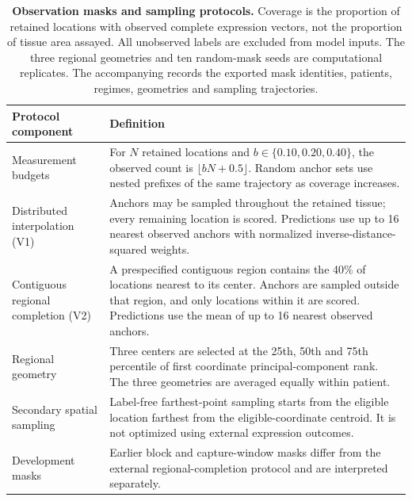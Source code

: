 \begin{table}[htbp]
\caption{\textbf{Observation masks and sampling protocols.} Coverage is the proportion of retained locations with observed complete expression vectors, not the proportion of tissue area assayed. All unobserved labels are excluded from model inputs. The three regional geometries and ten random-mask seeds are computational replicates. The accompanying \protect{} records the exported mask identities, patients, regimes, geometries and sampling trajectories.}
\label{tab:s6}
\centering\small
\begin{tabularx}{\textwidth}{>{\RaggedRight\arraybackslash}p{}Y}\toprule
Protocol component & Definition\\\midrule
Measurement budgets & For $N$ retained locations and $b\in\{0.10,0.20,0.40\}$, the observed count is $\lfloor bN+0.5\rfloor$. Random anchor sets use nested prefixes of the same trajectory as coverage increases.\\
Distributed interpolation (V1) & Anchors may be sampled throughout the retained tissue; every remaining location is scored. Predictions use up to 16 nearest observed anchors with normalized inverse-distance-squared weights.\\
Contiguous regional completion (V2) & A prespecified contiguous region contains the 40\% of locations nearest to its center. Anchors are sampled outside that region, and only locations within it are scored. Predictions use the mean of up to 16 nearest observed anchors.\\
Regional geometry & Three centers are selected at the 25th, 50th and 75th percentile of first coordinate principal-component rank. The three geometries are averaged equally within patient.\\
Secondary spatial sampling & Label-free farthest-point sampling starts from the eligible location farthest from the eligible-coordinate centroid. It is not optimized using external expression outcomes.\\
Development masks & Earlier block and capture-window masks differ from the external regional-completion protocol and are interpreted separately.\\
\bottomrule\end{tabularx}
\end{table}\clearpage
